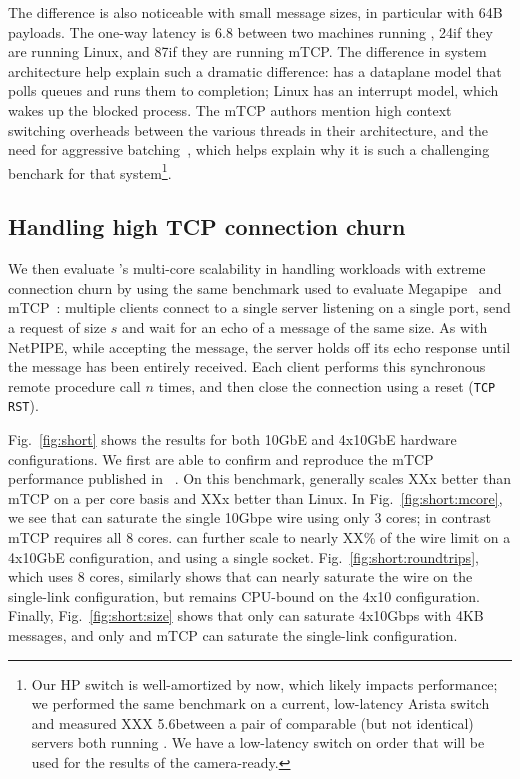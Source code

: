 The difference is also noticeable with small message sizes, in
particular with 64B payloads.  The one-way latency is 6.8\microsecond
between two machines running \ix, 24\microsecond if they are running
Linux, and 87\microsecond if they are running mTCP.  The
difference in system architecture help explain such a dramatic
difference: \ix has a dataplane model that polls queues and runs them
to completion; Linux has an interrupt model, which wakes up the
blocked process.  The mTCP authors mention high context switching
overheads between the various threads in their architecture, and the
need for aggressive batching~\cite{jeong2014mtcp}, which helps explain
why it is such a challenging benchark for that system\footnote{Our HP
  switch is well-amortized by now, which likely impacts performance;
  we performed the same benchmark on a current, low-latency Arista
  switch and measured XXX 5.6\microsecond between a pair of comparable
  (but not identical) servers both running \ix. We have a low-latency
  switch on order that will be used for the results of the
  camera-ready.}.

\subsection{Handling high TCP connection churn}
\label{sec:eval:short}


We then evaluate \ix's multi-core scalability in handling workloads
with extreme connection churn by using the same benchmark used to evaluate
Megapipe~\cite{han2012megapipe} and mTCP~\cite{jeong2014mtcp}:
multiple clients connect to a single server listening on a single
port, send a request of size $s$ and wait for an echo of a message of
the same size.  As with NetPIPE, while accepting the message, the server holds off its
echo response until the message has been entirely received.
Each client performs this synchronous remote procedure
call $n$ times, and then close the connection using a reset
(\texttt{TCP RST}).


 Fig.~\ref{fig:short} shows the results for both
10GbE and 4x10GbE hardware configurations.  We first
are able to confirm and reproduce the mTCP performance published in
~\cite{jeong2014mtcp}.  On this benchmark, \ix generally scales XXx
better than mTCP on a per core basis and XXx better than Linux.  In
Fig.~\ref{fig:short:mcore}, we see that \ix can saturate the single
10Gbpe wire using only 3 cores; in contrast mTCP requires all 8
cores. \ix can further scale to nearly XX\% of the wire limit on a
4x10GbE configuration, and using a single socket.
Fig.~\ref{fig:short:roundtrips}, which uses 8 cores, similarly shows
that \ix can nearly saturate the wire on the single-link
configuration, but remains CPU-bound on the 4x10 configuration.
Finally, Fig.~\ref{fig:short:size} shows that only \ix can saturate
4x10Gbps with 4KB messages, and only \ix and mTCP can saturate the
single-link configuration.


